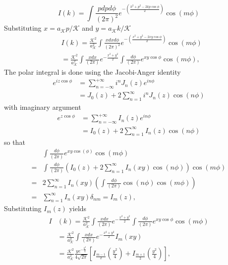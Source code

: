 \documentclass[english,aps,prd,nofootinbib,twocolumn]{revtex4-1}
\begin{document}
\begin{equation}
I(k)=\int \!\! \frac{p dp d\phi }{(2\pi)^2}
e^{-\left( 
\tfrac{k^{2}+p^{2}-2kp \cos \!\phi}{2} 
\right)}
\cos(m\phi)
\end{equation}
Substituting $x=a_{\mathcal{K}}p/\mathcal{K}$ and $y=a_{\mathcal{K}}k/\mathcal{K}$
\begin{equation}
\begin{split}
&I(k)=\frac{\mathcal{K}^{2}}{a_{\mathcal{K}}^{2}}\!\!
\int \!\! \frac{x dx d\phi }{(2\pi)^2}
e^{-\left( 
\tfrac{x^{2}+y^{2}-2xy \cos \!\phi}{2} 
\right)}
\!\! \cos(m\phi) \\ &=
\frac{\mathcal{K}^{2}}{a_{\mathcal{K}}^{2}}\!\!
\int \!\! \frac{x dx}{(2\pi)}
e^{-\tfrac{x^{2}+y^{2}}{2} } \!\!
\int \!\! \frac{d\phi }{(2\pi)}
e^{xy \cos \!\phi} 
\! \cos(m\phi)
,
\end{split}
\end{equation}
The polar integral is done using the Jacobi-Anger identity
\begin{equation}
\begin{split}
e^{iz\cos\phi} \!&= \!\!\!
\sum_{n=-\infty}^{+\infty}i^{n}J_{n}(z)e^{in\phi}
\\&= J_{0}(z) + 
2\sum_{n=1}^{\infty}i^{n}J_{n}(z)\cos(n\phi)
\end{split}
\end{equation}
with imaginary argument 
\begin{equation}
\begin{split}
e^{z\cos\phi}&=\sum_{n=-\infty}^{+\infty}I_{n}(z)e^{in\phi}
\\& = I_{0}(z) + 
2\sum_{n=1}^{\infty}I_{n}(z)\cos(n\phi)
\end{split}
\end{equation}
so that
\begin{equation}
\begin{split}
&
\int \!\! \frac{d\phi }{(2\pi)}
e^{xy \cos(\phi)} 
\! \cos(m\phi)
\\=&
\int \!\! \frac{d\phi }{(2\pi)}
\left(
I_{0}(z) + 
2\sum_{n=1}^{\infty}I_{n}(xy)\cos(n\phi)
\right)
\! \cos(m\phi)
\\=&
2\sum_{n=1}^{\infty}I_{n}(xy)
\left(
\int \!\! \frac{d\phi }{(2\pi)}
\cos(n\phi)\! \cos(m\phi)
\right)
\\=&
\sum_{n=1}^{\infty}I_{n}(xy) \delta_{nm}
= I_{m}(z)
,
\end{split}
\end{equation}
Substituting $I_{m}(z)$ yields
\begin{equation}
\begin{split}
I&(k) =
\frac{\mathcal{K}^{2}}{a_{\mathcal{K}}^{2}}\!\!
\int \!\! \frac{x dx}{(2\pi)}
e^{-\tfrac{x^{2}+y^{2}}{2} } \!\!
\int \!\! \frac{d\phi }{(2\pi)}
e^{xy \cos \!\phi} 
\! \cos(m\phi) 
\\ &=
\frac{\mathcal{K}^{2}}{a_{\mathcal{K}}^{2}}\!\!
\int \!\! \frac{x dx}{(2\pi)}
e^{-\tfrac{x^{2}+y^{2}}{2} } \! I_{m}(xy)
\\ &=
\frac{\mathcal{K}^{2}}{a_{\mathcal{K}}^{2}}
\frac{y e^{-\frac{y^{2}}{4}}}{4\sqrt{2\pi}}
\left[ 
I_{\frac{m-1}{2}}\left(\frac{y^{2}}{4}\right) + 
I_{\frac{m+1}{2}}\left(\frac{y^{2}}{4}\right)
\right]
,
\end{split}
\end{equation}
\end{document}
